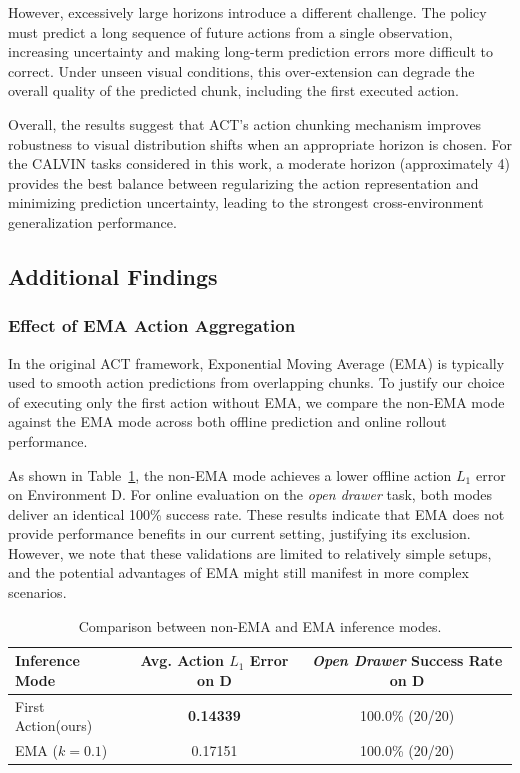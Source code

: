 However, excessively large horizons introduce a different challenge. The policy must predict a long sequence of future actions from a single observation, increasing uncertainty and making long-term prediction errors more difficult to correct. Under unseen visual conditions, this over-extension can degrade the overall quality of the predicted chunk, including the first executed action.

Overall, the results suggest that ACT's action chunking mechanism improves robustness to visual distribution shifts when an appropriate horizon is chosen. For the CALVIN tasks considered in this work, a moderate horizon (approximately 4) provides the best balance between regularizing the action representation and minimizing prediction uncertainty, leading to the strongest cross-environment generalization performance.

\subsection{Additional Findings}

\subsubsection{Effect of EMA Action Aggregation}

In the original ACT framework, Exponential Moving Average (EMA) is typically used to smooth action predictions from overlapping chunks. To justify our choice of executing only the first action without EMA, we compare the non-EMA mode against the EMA mode across both offline prediction and online rollout performance. 

As shown in Table~\ref{tab:ema_comparison}, the non-EMA mode achieves a lower offline action $L_1$ error on Environment D. For online evaluation on the \textit{open drawer} task, both modes deliver an identical 100\% success rate. These results indicate that EMA does not provide performance benefits in our current setting, justifying its exclusion. However, we note that these validations are limited to relatively simple setups, and the potential advantages of EMA might still manifest in more complex scenarios.

\begin{table}[h]
\centering
\caption{Comparison between non-EMA and EMA inference modes.}
\label{tab:ema_comparison}
\begin{tabular}{lcc}
\hline
\textbf{Inference Mode} & \textbf{Avg. Action $L_1$ Error on D} & \textbf{\textit{Open Drawer} Success Rate on D} \\ \hline
First Action(ours)             & \textbf{0.14339}                      & 100.0\% (20/20)                                 \\
EMA ($k=0.1$)                        & 0.17151                  & 100.0\% (20/20)                  \\ \hline
\end{tabular}
\end{table}

